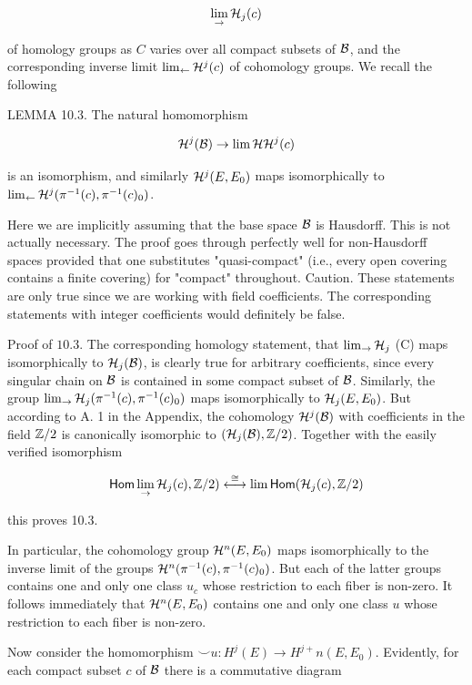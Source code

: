 \[
\lim _{\rightarrow} \mathcal{H}_{j}(c)
\]

of homology groups as $C$ varies over all compact subsets of $\mathcal{B}$, and the corresponding inverse limit $\lim _{\leftarrow} \mathcal{H}^{j}(c)$ of cohomology groups. We recall the following

LEMMA 10.3. The natural homomorphism

\[
\mathcal{H}^{j}(\mathcal{B}) \rightarrow \lim {\mathcal{H}} \mathcal{H}^{j}(c)
\]

is an isomorphism, and similarly $\mathcal{H}^{j}(E, E_{0})$ maps isomorphically to $\lim _{\leftarrow} \mathcal{H}^{j}(\pi^{-1}(c), \pi^{-1}(c)_{0})$.

Here we are implicitly assuming that the base space $\mathcal{B}$ is Hausdorff. This is not actually necessary. The proof goes through perfectly well for non-Hausdorff spaces provided that one substitutes "quasi-compact" (i.e., every open covering contains a finite covering) for "compact" throughout. Caution. These statements are only true since we are working with field coefficients. The corresponding statements with integer coefficients would definitely be false.

Proof of $10.3$. The corresponding homology statement, that $\lim _{\rightarrow} \mathcal{H}_{j}$ (C) maps isomorphically to $\mathcal{H}_{j}(\mathcal{B})$, is clearly true for arbitrary coefficients, since every singular chain on $\mathcal{B}$ is contained in some compact subset of $\mathcal{B}$. Similarly, the group $\lim _{\rightarrow} \mathcal{H}_{j}(\pi^{-1}(c), \pi^{-1}(c)_{0})$ maps isomorphically to $\mathcal{H}_{j}(E, E_{0})$. But according to A. 1 in the Appendix, the cohomology $\mathcal{H}^{j}(\mathcal{B})$ with coefficients in the field $\mathbb{Z} / 2$ is canonically isomorphic to $(\mathcal{H}_{j}(\mathcal{B}), \mathbb{Z} / 2)$. Together with the easily verified isomorphism

\[
\mathsf{Hom}  \lim _{\rightarrow} \mathcal{H}_{j}(c), \mathbb{Z} / 2) \stackrel{\cong}{\longleftrightarrow} \lim \mathsf{Hom} (\mathcal{H}_{j}(c), \mathbb{Z} / 2)
\]

this proves 10.3.

In particular, the cohomology group $\mathcal{H}^{ n }(E, E_{0})$ maps isomorphically to the inverse limit of the groups $\mathcal{H}^{ n }(\pi^{-1}(c), \pi^{-1}(c)_{0})$. But each of the latter groups contains one and only one class $u_{c}$ whose restriction to each fiber is non-zero. It follows immediately that $\mathcal{H}^{ n }(E, E_{0})$ contains one and only one class $u$ whose restriction to each fiber is non-zero.

Now consider the homomorphism $\smile u: H^{j}(E) \rightarrow H^{j+} n(E, E_{0})$. Evidently, for each compact subset $c$ of $\mathcal{B}$ there is a commutative diagram


